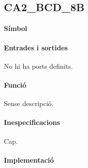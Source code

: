 \subsection{\label{sub:\projectname-CA2_BCD_8B} \textsf{CA2\_BCD\_8B}}

\paragraph{Símbol}

\begin{center}  \end{center}

\paragraph{Entrades i sortides}

No hi ha ports definits.

\paragraph{Funció}

Sense descripció.

\paragraph{Inespecificacions}

Cap.

\paragraph{Implementació}





\vspace{1cm}
